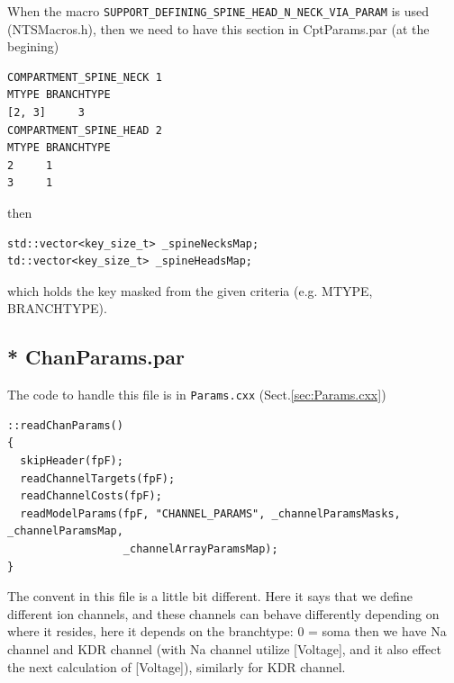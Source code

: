 When the macro \verb!SUPPORT_DEFINING_SPINE_HEAD_N_NECK_VIA_PARAM! is used
(NTSMacros.h), then we need to have this section in CptParams.par (at the
begining)

\begin{verbatim}
COMPARTMENT_SPINE_NECK 1
MTYPE BRANCHTYPE
[2, 3]     3
COMPARTMENT_SPINE_HEAD 2
MTYPE BRANCHTYPE
2     1
3     1
\end{verbatim}

then
\begin{verbatim}
std::vector<key_size_t> _spineNecksMap; 
td::vector<key_size_t> _spineHeadsMap;
\end{verbatim}
which holds the key masked from the given criteria (e.g. MTYPE, BRANCHTYPE).









\subsection{* ChanParams.par}
\label{sec:ChanParams.par}

The code to handle this file is in \verb!Params.cxx! (Sect.\ref{sec:Params.cxx})
\begin{verbatim}
::readChanParams()
{
  skipHeader(fpF);
  readChannelTargets(fpF);
  readChannelCosts(fpF);
  readModelParams(fpF, "CHANNEL_PARAMS", _channelParamsMasks, _channelParamsMap,
                  _channelArrayParamsMap);
}
\end{verbatim}


The convent in this file is a little bit different.
Here it says that we define different ion channels, and these channels can
behave differently depending on where it resides, here it depends on the
branchtype: 0 = soma then we have Na channel and KDR channel (with Na channel
utilize [Voltage], and it also effect the next calculation of [Voltage]),
similarly for KDR channel.

